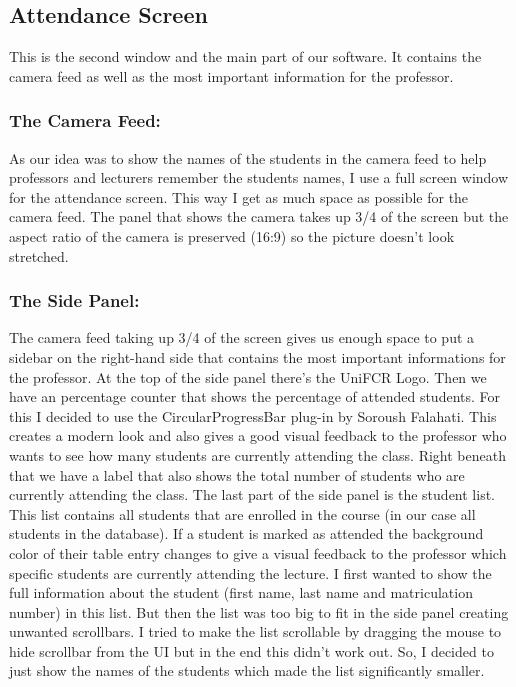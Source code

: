 \documentclass[12pt, a4paper]{article}
\begin{document}
\subsection{Attendance Screen}
This is the second window and the main part of our software. It contains the camera feed as well as the most important information for the professor.

\subsubsection{The Camera Feed:}
As our idea was to show the names of the students in the camera feed to help professors and lecturers remember the students names, I use a full screen window for the attendance screen. This way I get as much space as possible for the camera feed. The panel that shows the camera takes up 3/4 of the screen but the aspect ratio of the camera is preserved (16:9) so the picture doesn’t look stretched. 

\subsubsection{The Side Panel:}
The camera feed taking up 3/4 of the screen gives us enough space to put a sidebar on the right-hand side that contains the most important informations for the professor. At the top of the side panel there’s the UniFCR Logo. Then we have an percentage counter that shows the percentage of attended students. For this I decided to use the CircularProgressBar plug-in by Soroush Falahati. This creates a modern look and also gives a good visual feedback to the professor who wants to see how many students are currently attending the class. Right beneath that we have a label that also shows the total number of students who are currently attending the class. The last part of the side panel is the student list. This list contains all students that are enrolled in the course (in our case all students in the database). If a student is marked as attended the background color of their table entry changes to give a visual feedback to the professor which specific students are currently attending the lecture. I first wanted to show the full information about the student (first name, last name and matriculation number) in this list. But then the list was too big to fit in the side panel creating unwanted scrollbars. I tried to make the list scrollable by dragging the mouse to hide scrollbar from the UI but in the end this didn’t work out. So, I decided to just show the names of the students which made the list significantly smaller. 
\end{document}
